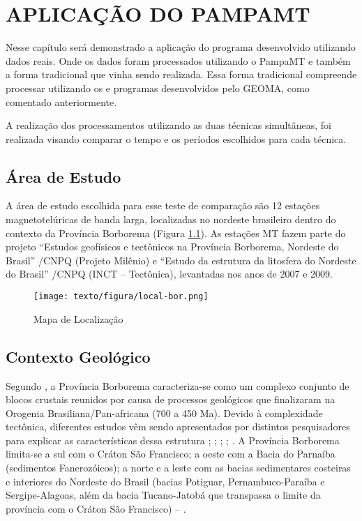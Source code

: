 \chapter{APLICAÇÃO DO PAMPAMT}
    
    Nesse capítulo será demonstrado a aplicação do programa desenvolvido utilizando dados reais. Onde os dados foram processados utilizando o PampaMT e também a forma tradicional que vinha sendo realizada. Essa forma tradicional compreende processar utilizando os  e programas desenvolvidos pelo GEOMA, como comentado anteriormente.
    
    A realização dos processamentos utilizando as duas técnicas simultâneas, foi realizada visando comparar o tempo e os períodos escolhidos para cada técnica.  
    
    \section{Área de Estudo}
        
        A área de estudo escolhida para esse teste de comparação são 12 estações magnetotelúricas de banda larga, localizadas no nordeste brasileiro dentro do contexto da Província Borborema (Figura \ref{local-bor}). As estações MT fazem parte do projeto ``Estudos geofísicos e tectônicos na Província Borborema, Nordeste do Brasil” /CNPQ (Projeto Milênio) e “Estudo da estrutura da litosfera do Nordeste do Brasil” /CNPQ (INCT – Tectônica), levantadas nos anos de 2007 e 2009.
        
    \begin{figure}[H]
        \caption{Mapa de Localização}
            \begin{center}
                \texttt{[image: texto/figura/local-bor.png]}
            \end{center}
        \label{local-bor}
    \end{figure}        
        
    \section{Contexto Geológico}
    
    Segundo \cite{almeida}, a Província Borborema caracteriza-se como um complexo conjunto de blocos crustais reunidos por causa de processos geológicos que finalizaram na Orogenia Brasiliana/Pan-africana (700 a 450 Ma). Devido à complexidade tectônica, diferentes estudos vêm sendo apresentados por distintos pesquisadores para explicar as características dessa estrutura \cite{van}; \cite{teseandrea}; \cite{santos2014deep}; \cite{padilha}; \cite{barbosa}. A Província Borborema limita-se a sul com o Cráton São Francisco; a oeste com a Bacia do Parnaíba (sedimentos Fanerozóicos); a norte e a leste com as bacias sedimentares costeiras e interiores do Nordeste do Brasil (bacias Potiguar, Pernambuco-Paraíba e Sergipe-Alagoas, além da bacia Tucano-Jatobá que transpassa o limite da província com o Cráton São Francisco) -- \cite{medeiros}.    
    
